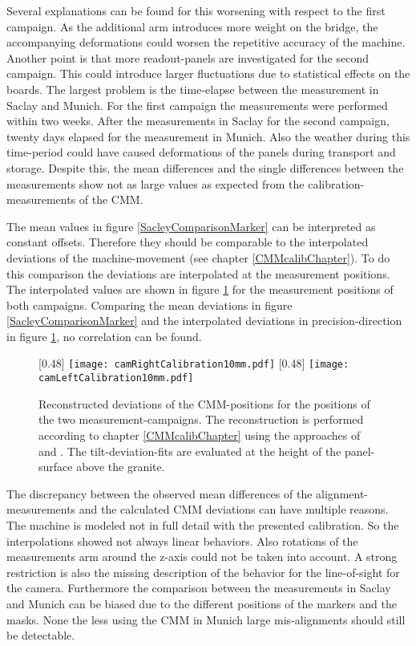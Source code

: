 \documentclass[
twoside,            %
BCOR1.4cm,          %
10pt,               %
headings=normal,    %
headsepline,        %
clearplainpage,		%
final,              %
div=14,
open=right,
bibliography=toc
]{scrreprt}
\begin{document}
Several explanations can be found for this worsening with respect to the first campaign.
As the additional arm introduces more weight on the bridge, the accompanying deformations could worsen the repetitive accuracy of the machine.
Another point is that more readout-panels are investigated for the second campaign.
This could introduce larger fluctuations due to statistical effects on the boards.
The largest problem is the time-elapse between the measurement in Saclay and Munich.
For the first campaign the measurements were performed within two weeks.
After the measurements in Saclay for the second campaign, twenty days elapsed for the measurement in Munich.
Also the weather during this time-period could have caused deformations of the panels during transport and storage.
Despite this, the mean differences and the single differences between the measurements show not as large values as expected from the calibration-measurements of the CMM.

The mean values in figure \ref{SacleyComparisonMarker} can be interpreted as constant offsets. 
Therefore they should be comparable to the interpolated deviations of the machine-movement (see chapter \ref{CMMcalibChapter}).
To do this comparison the deviations are interpolated at the measurement positions.
The interpolated values are shown in figure \ref{cmmCalibrations} for the measurement positions of both campaigns.
Comparing the mean deviations in figure \ref{SacleyComparisonMarker} and the interpolated deviations in precision-direction in figure \ref{cmmCalibrations}, no correlation can be found.

\begin{figure}[!h]
	\centering
	[0.48\textwidth]
	{\texttt{[image: camRightCalibration10mm.pdf]}}
	\hfill
	[0.48\textwidth]
	{\texttt{[image: camLeftCalibration10mm.pdf]}}
	\vspace{-2mm}
	\caption{
		Reconstructed deviations of the CMM-positions for the positions of the two measurement-campaigns.
		The reconstruction is performed according to chapter \ref{CMMcalibChapter} using the approaches of \cite{feilThesis} and \cite{neubertThesis}.
		The tilt-deviation-fits are evaluated at the height of the panel-surface above the granite.
	}
	\label{cmmCalibrations}
\end{figure}

The discrepancy between the observed mean differences of the alignment-measurements and the calculated CMM deviations can have multiple reasons.
The machine is modeled not in full detail with the presented calibration.
So the interpolations showed not always linear behaviors.
Also rotations of the measurements arm around the z-axis could not be taken into account.
A strong restriction is also the missing description of the behavior for the line-of-sight for the camera.
Furthermore the comparison between the measurements in Saclay and Munich can be biased due to the different positions of the markers and the masks.
None the less using the CMM in Munich large mis-alignments should still be detectable.
\end{document}
